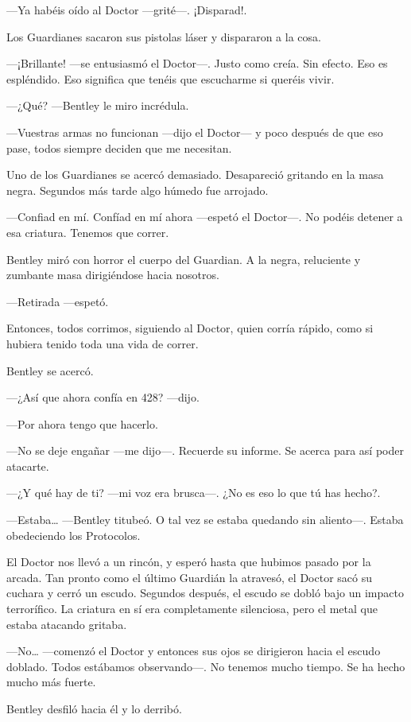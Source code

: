 ---Ya habéis oído al Doctor ---grité---. ¡Disparad!.

Los Guardianes sacaron sus pistolas láser y dispararon a la cosa.

---¡Brillante! ---se entusiasmó el Doctor---. Justo como creía. Sin
efecto. Eso es espléndido. Eso significa que tenéis que escucharme si
queréis vivir.

---¿Qué? ---Bentley le miro incrédula.

---Vuestras armas no funcionan ---dijo el Doctor--- y poco después de
que eso pase, todos siempre deciden que me necesitan.

Uno de los Guardianes se acercó demasiado. Desapareció gritando en la
masa negra. Segundos más tarde algo húmedo fue arrojado.

---Confiad en mí. Confíad en mí ahora ---espetó el Doctor---. No podéis
detener a esa criatura. Tenemos que correr.

Bentley miró con horror el cuerpo del Guardian. A la negra, reluciente y
zumbante masa dirigiéndose hacia nosotros.

---Retirada ---espetó.

Entonces, todos corrimos, siguiendo al Doctor, quien corría rápido, como
si hubiera tenido toda una vida de correr.

Bentley se acercó.

---¿Así que ahora confía en 428? ---dijo.

---Por ahora tengo que hacerlo.

---No se deje engañar ---me dijo---. Recuerde su informe. Se acerca para
así poder atacarte.

---¿Y qué hay de ti? ---mi voz era brusca---. ¿No es eso lo que tú has
hecho?.

---Estaba\ldots{} ---Bentley titubeó. O tal vez se estaba quedando sin
aliento---. Estaba obedeciendo los Protocolos.

El Doctor nos llevó a un rincón, y esperó hasta que hubimos pasado por
la arcada. Tan pronto como el último Guardián la atravesó, el Doctor
sacó su cuchara y cerró un escudo. Segundos después, el escudo se dobló
bajo un impacto terrorífico. La criatura en sí era completamente
silenciosa, pero el metal que estaba atacando gritaba.

---No\ldots{} ---comenzó el Doctor y entonces sus ojos se dirigieron
hacia el escudo doblado. Todos estábamos observando---. No tenemos mucho
tiempo. Se ha hecho mucho más fuerte.

Bentley desfiló hacia él y lo derribó.

